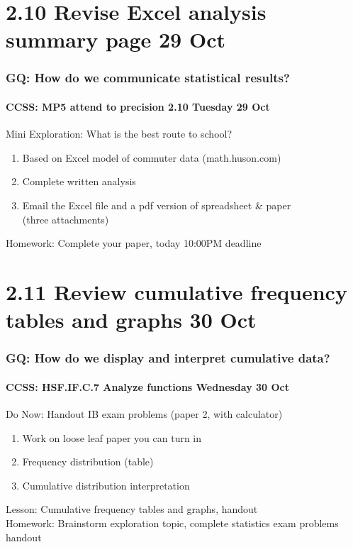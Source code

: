 \documentclass{beamer}
\begin{document}
  \section{2.10 Revise Excel analysis summary page 29 Oct}
  \frame
  {
    \frametitle{GQ: How do we communicate statistical results?}
    \framesubtitle{CCSS: MP5 attend to precision \hfill \alert{2.10 Tuesday 29 Oct}}

    \begin{block}{Mini Exploration: What is the best route to school?}
      \begin{enumerate}
        \item Based on Excel model of commuter data (math.huson.com)
        \item Complete written analysis
        \item Email the Excel file and a pdf version of spreadsheet \& paper\\
        (three attachments)
    \end{enumerate}
    \end{block}
    Homework: Complete your paper, today 10:00PM deadline
  }


  \section{2.11 Review cumulative frequency tables and graphs 30 Oct}
  \frame
  {
    \frametitle{GQ: How do we display and interpret cumulative data?}
    \framesubtitle{CCSS: HSF.IF.C.7 Analyze functions \hfill \alert{Wednesday 30 Oct}}

    \begin{block}{Do Now: Handout IB exam problems (paper 2, with calculator)}
    \begin{enumerate}
        \item Work on loose leaf paper you can turn in
        \item Frequency distribution (table)
        \item Cumulative distribution interpretation
    \end{enumerate}
    \end{block}
    Lesson: Cumulative frequency tables and graphs, handout\\ \smallskip
    Homework: Brainstorm exploration topic, complete statistics exam problems handout
  }
\end{document}
